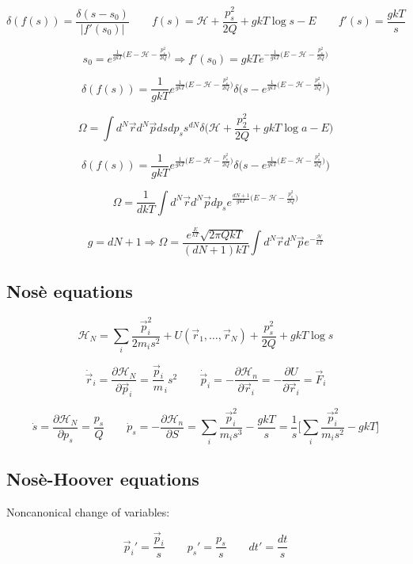 $$\delta(f(s)) = \frac{\delta(s-s_0)}{|f'(s_0)|}\qquad f(s) = \mathcal{H}+\frac{p_s^2}{2Q} + gkT\log s - E\qquad f'(s) = \frac{gkT}{s}$$

$$s_0 = e^{\frac{1}{gkT}\bigl(E-\mathcal{H}-\frac{p_s^2}{2Q}\bigr)}\Rightarrow f'(s_0) = gkTe^{-\frac{1}{gkT}\bigl(E-\mathcal{H}-\frac{p_s^2}{2Q}\bigr)}$$

$$\delta(f(s)) = \frac{1}{gkT}e^{\frac{1}{gkT}\bigl(E-\mathcal{H}-\frac{p_s^2}{2Q}\bigr)}\delta\biggl(s-e^{\frac{1}{gkT}\bigl(E-\mathcal{H}-\frac{p_s^2}{2Q}\bigr)}\biggr)$$

$$\Omega = \int d^N\vec{r}d^N\vec{p}dsdp_ss^{dN}\delta\biggl(\mathcal{H}+\frac{p_2^2}{2Q}+gkT\log a-E\biggr)$$

$$\delta(f(s)) = \frac{1}{gkT}e^{\frac{1}{gkT}\bigl(E-\mathcal{H}-\frac{p_s^2}{2Q}\bigr)}\delta\biggl(s-e^{\frac{1}{gkT}\bigl(E-\mathcal{H}-\frac{p_s^2}{2Q}\bigr)}\biggr)$$

$$\Omega = \frac{1}{dkT}\int d^N\vec{r}d^N\vec{p}dp_se^{\frac{dN+1}{gkT}\bigl(E-\mathcal{H}-\frac{p_s^2}{2Q}\bigr)}$$

$$g = dN + 1\Rightarrow\Omega = \frac{e^{\frac{E}{kT}}\sqrt{2\pi QkT}}{(dN+1)kT}\int d^N\vec{r}d^N\vec{p}e^{-\frac{\mathcal{H}}{kT}}$$

	\subsection{Nos\`e equations}

	$$\mathcal{H}_N = \sum\limits_i\frac{\vec{p}_i^2}{2m_is^2}+U(\vec{r}_1,\dots, \vec{r}_N) + \frac{p_s^2}{2Q} + gkT\log s$$

	$$\dot{\vec{r}}_i = \frac{\partial\mathcal{H}_N}{\partial\vec{p}_i} = \frac{\vec{p}_i}m_is^2\qquad \dot{\vec{p}}_i = -\frac{\partial\mathcal{H}_n}{\partial\vec{r}_i} = -\frac{\partial U}{\partial\vec{r}_i} = \vec{F}_i$$

	$$\dot{s} = \frac{\partial\mathcal{H}_N}{\partial p_s} = \frac{p_s}{Q}\qquad \dot{p}_s = -\frac{\partial\mathcal{H}_n}{\partial S} = \sum\limits_i\frac{\vec{p}_i^2}{m_is^3} - \frac{gkT}{s} = \frac{1}{s}\biggl[\sum\limits_i\frac{\vec{p}_i^2}{m_is^2}-gkT\biggr]$$

	\subsection{Nos\`e-Hoover equations}
	Noncanonical change of variables:

	$$\vec{p}_i' = \frac{\vec{p}_i}{s}\qquad p_s' = \frac{p_s}{s}\qquad dt' = \frac{dt}{s}$$

